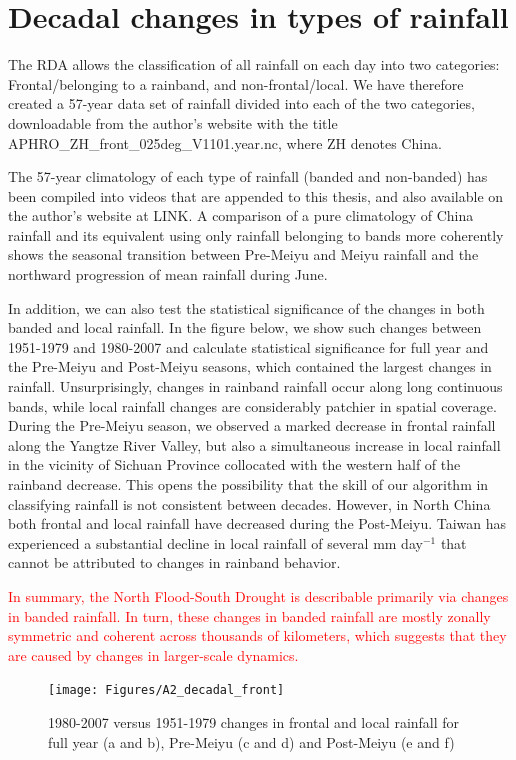 \section{Decadal changes in types of rainfall}
The RDA allows the classification of all rainfall on each day into two categories: Frontal/belonging to a rainband, and non-frontal/local. We have therefore created a 57-year data set of rainfall divided into each of the two categories, downloadable from the author's website with the title APHRO_ZH_front_025deg_V1101.year.nc, where ZH denotes China.

The 57-year climatology of each type of rainfall (banded and non-banded) has been compiled into videos that are appended to this thesis, and also available on the author's website at LINK. A comparison of a pure climatology of China rainfall and its equivalent using only rainfall belonging to bands more coherently shows the seasonal transition between Pre-Meiyu and Meiyu rainfall and the northward progression of mean rainfall during June.

In addition, we can also test the statistical significance of the changes in both banded and local rainfall. In the figure below, we show such changes between 1951-1979 and 1980-2007 and calculate statistical significance for full year and the Pre-Meiyu and Post-Meiyu seasons, which contained the largest changes in rainfall. Unsurprisingly, changes in rainband rainfall occur along long continuous bands, while local rainfall changes are considerably patchier in spatial coverage. During the Pre-Meiyu season, we observed a marked decrease in frontal rainfall along the Yangtze River Valley, but also a simultaneous increase in local rainfall in the vicinity of Sichuan Province collocated with the western half of the rainband decrease. This opens the possibility that the skill of our algorithm in classifying rainfall is not consistent between decades. However, in North China both frontal and local rainfall have decreased during the Post-Meiyu. Taiwan has experienced a substantial decline in local rainfall of several mm day$^{-1}$ that cannot be attributed to changes in rainband behavior.

\textcolor{red}{In summary, the North Flood-South Drought is describable primarily via changes in banded rainfall. In turn, these changes in banded rainfall are mostly zonally symmetric and coherent across thousands of kilometers, which suggests that they are caused by changes in larger-scale dynamics.}

\begin{figure}[htb]

\noindent\texttt{[image: Figures/A2\_decadal\_front]}
\caption{1980-2007 versus 1951-1979 changes in frontal and local rainfall for full year (a and b), Pre-Meiyu (c and d) and Post-Meiyu (e and f)}
\end{figure}

